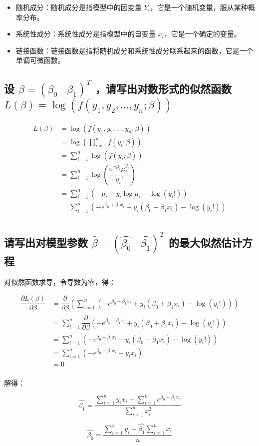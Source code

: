 \documentclass[]{article}
\newcommand\df[2]{\dfrac{#1}{#2}}
\newcommand\pdf[2]{\dfrac{\partial#1}{\partial#2}}
\begin{document}
\begin{itemize}
    \item 随机成分：随机成分是指模型中的因变量 $Y_i$，它是一个随机变量，服从某种概率分布。
    \item 系统性成分：系统性成分是指模型中的自变量 $x_i$，它是一个确定的变量。
    \item 链接函数：链接函数是指将随机成分和系统性成分联系起来的函数，它是一个单调可微函数。
\end{itemize}

\subsection{设 $\beta=(\beta_0\ \ \ \ \beta_1)^T$ ，请写出对数形式的似然函数 $L(\beta)=\log(f(y_1,y_2,...,y_n;\beta))$}

\begin{equation}
    \begin{aligned}
        L(\beta)
        &=\log(f(y_1,y_2,...,y_n;\beta))\\
        &=\log(\prod_{i=1}^nf(y_i;\beta))\\
        &=\sum_{i=1}^n\log(f(y_i;\beta))\\
        &=\sum_{i=1}^n\log(\df{e^{-\mu_i}\mu_i^{y_i}}{y_i!})\\
        &=\sum_{i=1}^n(-\mu_i+y_i\log\mu_i-\log(y_i!))\\
        &=\sum_{i=1}^n(-e^{\beta_0+\beta_1x_i}+y_i(\beta_0+\beta_1x_i)-\log(y_i!))\\
    \end{aligned}
\end{equation}

\subsection{请写出对模型参数 $\hat{\beta}=(\hat{\beta_0}\ \ \ \ \hat{\beta_1})^T$ 的最大似然估计方程}

对似然函数求导，令导数为零，得：

\begin{equation}
    \begin{aligned}
        \pdf{L(\beta)}{\beta}
        &=\pdf{}{\beta}(\sum_{i=1}^n(-e^{\beta_0+\beta_1x_i}+y_i(\beta_0+\beta_1x_i)-\log(y_i!)))\\
        &=\sum_{i=1}^n\pdf{}{\beta}(-e^{\beta_0+\beta_1x_i}+y_i(\beta_0+\beta_1x_i)-\log(y_i!))\\
        &=\sum_{i=1}^n(-e^{\beta_0+\beta_1x_i}+y_i(\beta_0+\beta_1x_i)-\log(y_i!))\\
        &=\sum_{i=1}^n(-e^{\beta_0+\beta_1x_i}+y_ix_i)\\
        &=0\\
    \end{aligned}
\end{equation}

解得：

$$\hat{\beta_1}=\df{\sum_{i=1}^ny_ix_i-\sum_{i=1}^ne^{\beta_0+\beta_1x_i}}{\sum_{i=1}^nx_i^2}$$

$$\hat{\beta_0}=\df{\sum_{i=1}^ny_i-\hat{\beta_1}\sum_{i=1}^nx_i}{n}$$
\end{document}
